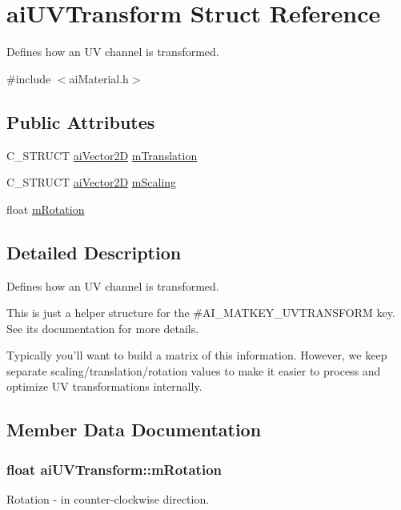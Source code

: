 \hypertarget{structai_u_v_transform}{\section{ai\-U\-V\-Transform Struct Reference}
\label{structai_u_v_transform}
}


Defines how an U\-V channel is transformed.  




{\ttfamily \#include $<$ai\-Material.\-h$>$}

\subsection*{Public Attributes}
\begin{DoxyCompactItemize}
\item 
C\-\_\-\-S\-T\-R\-U\-C\-T \hyperlink{structai_vector2_d}{ai\-Vector2\-D} \hyperlink{structai_u_v_transform_a8c7f35959aa342bf0cef670246fbb813}{m\-Translation}
\item 
C\-\_\-\-S\-T\-R\-U\-C\-T \hyperlink{structai_vector2_d}{ai\-Vector2\-D} \hyperlink{structai_u_v_transform_a89429a027cbf914e7212e48149a957c8}{m\-Scaling}
\item 
float \hyperlink{structai_u_v_transform_aa8dcf39ccd39f786b3f5f163bd663792}{m\-Rotation}
\end{DoxyCompactItemize}


\subsection{Detailed Description}
Defines how an U\-V channel is transformed. 

This is just a helper structure for the \#\-A\-I\-\_\-\-M\-A\-T\-K\-E\-Y\-\_\-\-U\-V\-T\-R\-A\-N\-S\-F\-O\-R\-M key. See its documentation for more details.

Typically you'll want to build a matrix of this information. However, we keep separate scaling/translation/rotation values to make it easier to process and optimize U\-V transformations internally. 

\subsection{Member Data Documentation}
\hypertarget{structai_u_v_transform_aa8dcf39ccd39f786b3f5f163bd663792}{
\subsubsection[{m\-Rotation}]{\setlength{\rightskip}{0pt plus 5cm}float ai\-U\-V\-Transform\-::m\-Rotation}}\label{structai_u_v_transform_aa8dcf39ccd39f786b3f5f163bd663792}
Rotation -\/ in counter-\/clockwise direction.

